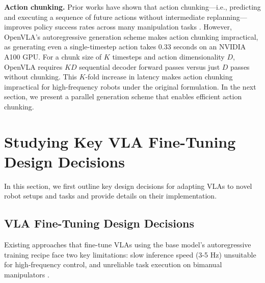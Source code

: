 \documentclass[conference]{IEEEtran}
\begin{document}
\textbf{Action chunking.} Prior works have shown that action chunking---i.e., predicting and executing a sequence of future actions without intermediate replanning---improves policy success rates across many manipulation tasks \citep{zhao2023learning, chi2023diffusion, liu2024bidirectional}. However, OpenVLA's autoregressive generation scheme makes action chunking impractical, as generating even a single-timestep action takes 0.33 seconds on an NVIDIA A100 GPU. For a chunk size of $K$ timesteps and action dimensionality $D$, OpenVLA requires $KD$ sequential decoder forward passes versus just $D$ passes without chunking. This $K$-fold increase in latency makes action chunking impractical for high-frequency robots under the original formulation. In the next section, we present a parallel generation scheme that enables efficient action chunking.

\section{Studying Key VLA Fine-Tuning Design Decisions}
\label{sec:design_decisions}

In this section, we first outline key design decisions for adapting VLAs to novel robot setups and tasks and provide details on their implementation.

\subsection{VLA Fine-Tuning Design Decisions}
\label{sec:finetuning_design_decisions}

Existing approaches that fine-tune VLAs using the base model's autoregressive training recipe face two key limitations: slow inference speed (3-5 Hz) unsuitable for high-frequency control, and unreliable task execution on bimanual manipulators \citep{wen2024tinyvla, liu2024rdt, black2024pi_0}.
\end{document}

